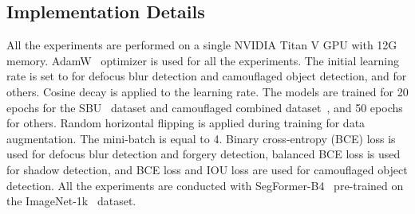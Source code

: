 \subsection{Implementation Details}
All the experiments are performed on a single NVIDIA Titan V GPU with 12G memory. AdamW~\cite{adam} optimizer is used for all the experiments. The initial learning rate is set to  for defocus blur detection and camouflaged object detection, and  for others. Cosine decay is applied to the learning rate. The models are trained for 20 epochs for the SBU~\cite{sbu} dataset and camouflaged combined dataset~\cite{fan2020camouflaged,skurowski2018animal}, and 50 epochs for others. Random horizontal flipping is applied during training for data augmentation. The mini-batch is equal to 4. Binary cross-entropy (BCE) loss is used for defocus blur detection and forgery detection, balanced BCE loss is used for shadow detection, and BCE loss and IOU loss are used for camouflaged object detection. All the experiments are conducted with SegFormer-B4~\cite{xie2021segformer} pre-trained on the ImageNet-1k~\cite{imagenet} dataset.
 

